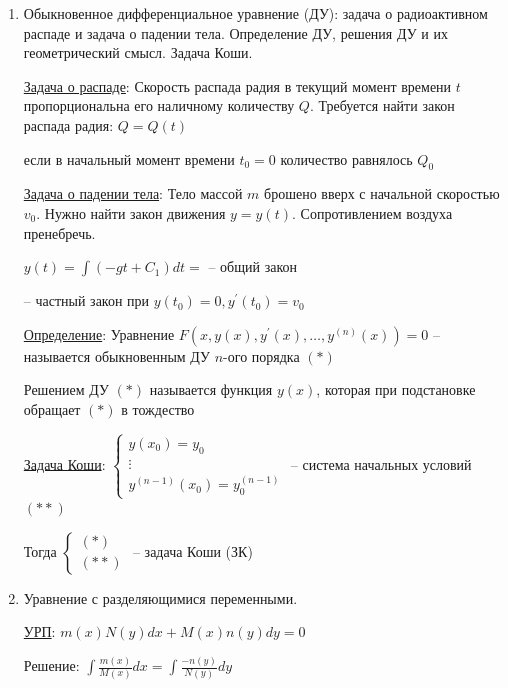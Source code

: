 \documentclass[12pt]{article}
\begin{document}
    \begin{enumerate}
        \item Обыкновенное дифференциальное уравнение (ДУ): задача о радиоактивном распаде и задача о падении тела. Определение ДУ, решения ДУ и их геометрический смысл. Задача Коши.

        \hyperlink{radiumproblem}{Задача о распаде}: Скорость распада радия в текущий момент времени $t$ пропорциональна его наличному количеству $Q$. Требуется найти закон распада радия: $Q = Q(t)$

        если в начальный момент времени $t_0 = 0$ количество равнялось $Q_0$


        \hyperlink{freefallingbodyproblem}{Задача о падении тела}: Тело массой $m$ брошено вверх с начальной скоростью $v_0$. Нужно найти закон движения $y = y(t)$.
        Сопротивлением воздуха пренебречь.

        $y(t) = \int (-gt + C_1) dt = $ -- общий закон

         -- частный закон при $y(t_0) = 0, y^\prime(t_0) = v_0$

        \hyperlink{differentialequationdefinition}{Определение}: Уравнение $F(x, y(x), y^\prime(x), \dots, y^{(n)}(x)) = 0$ -- называется обыкновенным ДУ $n$-ого порядка $(*)$

        Решением ДУ $(*)$ называется функция $y(x)$, которая при подстановке обращает $(*)$ в тождество

        \hyperlink{problemCauchy}{Задача Коши}: $\begin{cases}y(x_0) = y_0 \\ \vdots \\ y^{(n - 1)}(x_0) = y_0^{(n - 1)}\end{cases}$ -- система начальных условий $(**)$

        Тогда $\begin{cases}(*) \\ (**)\end{cases}$ -- задача Коши (ЗК)

        \item Уравнение с разделяющимися переменными.

        \hyperlink{equationwithseparablevariables}{УРП}: $m(x)N(y)dx + M(x)n(y)dy = 0$

        Решение: $\int \frac{m(x)}{M(x)}dx = \int\frac{-n(y)}{N(y)}dy$


\end{enumerate}
\end{document}
